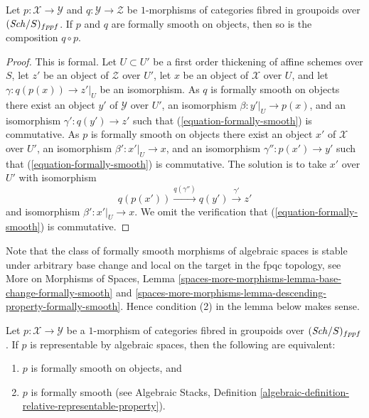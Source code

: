 \begin{lemma}
\label{lemma-composition-formally-smooth}
Let $p : \mathcal{X} \to \mathcal{Y}$ and $q : \mathcal{Y} \to \mathcal{Z}$
be $1$-morphisms of categories fibred in groupoids over $(\mathit{Sch}/S)_{fppf}$.
If $p$ and $q$ are formally smooth on objects, then so is the composition
$q \circ p$.
\end{lemma}

\begin{proof}
This is formal. Let $U \subset U'$ be a first order thickening
of affine schemes over $S$, let $z'$ be an object of $\mathcal{Z}$
over $U'$, let $x$ be an object of $\mathcal{X}$ over $U$,
and let $\gamma : q(p(x)) \to z'|_U$ be an isomorphism. As $q$ is
formally smooth on objects there exist an object
$y'$ of $\mathcal{Y}$ over $U'$, an isomorphism
$\beta : y'|_U \to p(x)$, and an isomorphism $\gamma' : q(y') \to z'$
such that (\ref{equation-formally-smooth}) is commutative. As $p$ is
formally smooth on objects there exist an object
$x'$ of $\mathcal{X}$ over $U'$, an isomorphism
$\beta' : x'|_U \to x$, and an isomorphism $\gamma'' : p(x') \to y'$
such that (\ref{equation-formally-smooth}) is commutative.
The solution is to take $x'$ over $U'$ with isomorphism
$$
q(p(x')) \xrightarrow{q(\gamma'')} q(y') \xrightarrow{\gamma'} z'
$$
and isomorphism $\beta' : x'|_U \to x$. We omit the verification
that (\ref{equation-formally-smooth}) is commutative.
\end{proof}

\noindent
Note that the class of formally smooth morphisms of algebraic spaces is
stable under arbitrary base change and local on the target in the
fpqc topology, see
More on Morphisms of Spaces,
Lemma \ref{spaces-more-morphisms-lemma-base-change-formally-smooth} and
\ref{spaces-more-morphisms-lemma-descending-property-formally-smooth}.
Hence condition (2) in the lemma below makes sense.

\begin{lemma}
\label{lemma-representable-by-spaces-formally-smooth}
Let $p : \mathcal{X} \to \mathcal{Y}$ be a $1$-morphism of categories
fibred in groupoids over $(\mathit{Sch}/S)_{fppf}$. If $p$ is
representable by algebraic spaces, then the following are equivalent:
\begin{enumerate}
\item $p$ is formally smooth on objects, and
\item $p$ is formally smooth (see
Algebraic Stacks,
Definition \ref{algebraic-definition-relative-representable-property}).
\end{enumerate}
\end{lemma}


